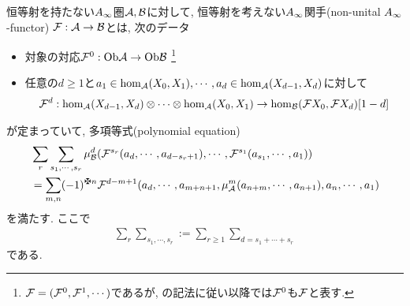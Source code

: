 \documentclass[uplatex, a4paper, 14Q, dvipdfmx]{jsarticle}
\begin{document}
\begin{definition}
  恒等射を持たない$A_{\infty}$圏$\mathcal{A}, \mathcal{B}$に対して, 恒等射を考えない$A_{\infty}$関手(non-unital $A_{\infty}$-functor) $\mathcal{F} : \mathcal{A} \to \mathcal{B}$とは, 次のデータ
  \begin{itemize}
    \item 対象の対応$\mathcal{F}^0 : \mathrm{Ob}\mathcal{A} \to \mathrm{Ob}\mathcal{B}$
    \footnote{
      $\mathcal{F}=(\mathcal{F}^0,\mathcal{F}^1,\cdots)$であるが, \cite{Sei}の記法に従い以降では$\mathcal{F}^0$も$\mathcal{F}$と表す. 
    }
    \item 任意の$d \geq 1$と$a_1 \in \hom_{\mathcal{A}}(X_0,X_1), \cdots, a_d \in \hom_{\mathcal{A}}(X_{d-1},X_d)$に対して
    \begin{align*}
      \mathcal{F}^d : \hom_{\mathcal{A}}(X_{d-1},X_d) \otimes \cdots \otimes \hom_{\mathcal{A}}(X_0,X_1) \to \hom_{\mathcal{B}}(\mathcal{F} X_0,\mathcal{F} X_d)[1-d]
    \end{align*}
  \end{itemize}
  が定まっていて, 多項等式(polynomial equation)
  \begin{align*}
    &\sum_r \sum_{s_1,\cdots,s_r} \mu^d_\B (\F^{s_r} (a_d,\cdots,a_{d-s_r+1}), \cdots, \F^{s_1}(a_{s_1},\cdots,a_1)) \\ 
    &= \sum_{m,n} (-1)^{\maltese n} \F^{d-m+1} (a_d,\cdots,a_{m+n+1}, \mu^m_\A(a_{n+m},\cdots,a_{n+1}), a_n,\cdots,a_1)
  \end{align*}
  を満たす. 
  ここで
  \begin{align*}
    \sum_r \sum_{s_1,\cdots,s_r} 
    := \sum_{r \geq 1} \sum_{d = s_1 + \cdots + s_r}
  \end{align*}
  である. 
\end{definition}
\end{document}
